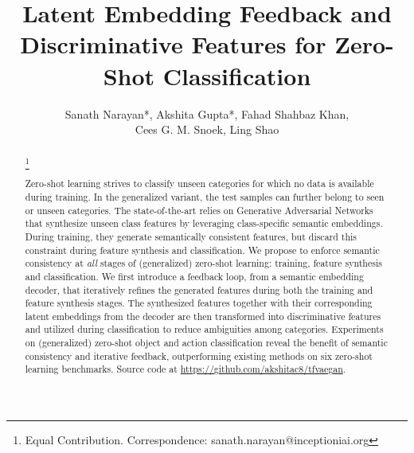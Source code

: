 \documentclass[runningheads]{llncs}
\newcommand\blfootnote[1]{\begingroup
  \renewcommand\thefootnote{}\footnote{#1}\addtocounter{footnote}{-1}\endgroup
}
\begin{document}
\pagestyle{headings}
\mainmatter
\def\ECCVSubNumber{}  

\title{Latent Embedding Feedback and Discriminative Features for Zero-Shot Classification} 



\author{Sanath Narayan*, Akshita Gupta*, Fahad Shahbaz Khan, \\
Cees G. M. Snoek, Ling Shao}

\maketitle

\begin{abstract}
\blfootnote{ Equal Contribution. Correspondence: sanath.narayan@inceptioniai.org}Zero-shot learning strives to classify unseen categories for which no data is available during training. In the generalized variant, the test samples can further belong to seen or unseen categories. The state-of-the-art relies on Generative Adversarial Networks that synthesize unseen class features by leveraging class-specific semantic embeddings. During training, they generate semantically consistent features, but discard this constraint during feature synthesis and classification. We propose to enforce semantic consistency at \emph{all} stages of (generalized) zero-shot learning: training, feature synthesis and classification. We first introduce a feedback loop, from a semantic embedding decoder, that iteratively refines the generated features during both the training and feature synthesis stages. 
The synthesized features together with their corresponding latent embeddings from the decoder are then transformed into discriminative features and utilized during classification to reduce ambiguities among categories. 
Experiments on (generalized) zero-shot object and action classification reveal the benefit of semantic consistency and iterative feedback, outperforming existing methods on six zero-shot learning benchmarks. 
Source code at \url{https://github.com/akshitac8/tfvaegan}.
\end{abstract}
\end{document}
